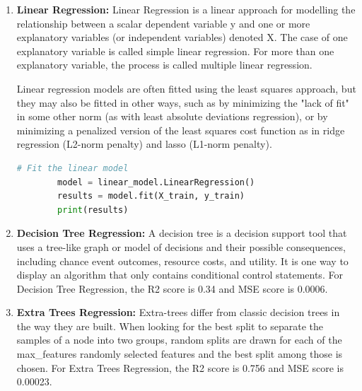 \begin{enumerate}
\begin{lstlisting}[language=Python]
			for i in range(epochs_ratio):
			history = model.fit(features_train, targets_train, epochs=epochs_step, batch_size=100, verbose=0)
			
			# Evaluate the model on the training and validation sets
			print("Step: ", i * epochs_step, "/", epochs_tot)
			train_mse = model.evaluate(features_train, targets_train, verbose=0)[1]
			print("Training MSE:", train_mse)
			val_mse = model.evaluate(features_validation, targets_validation, verbose=0)[1]
			print("Validation MSE:", val_mse, "\n")
			
			# Append the MSE values to the history array
			hist = np.concatenate((hist, np.array(history.history['mean_squared_error'])), axis=0)
		\end{lstlisting}
	
	
	\item \textbf{Linear Regression:}
	 Linear Regression is a linear approach for modelling the relationship between a scalar dependent variable y and one or more explanatory variables (or independent variables) denoted X. The case of one explanatory variable is called simple linear regression. For more than one explanatory variable, the process is called multiple linear regression.
	 
	 Linear regression models are often fitted using the least squares approach, but they may also be fitted in other ways, such as by minimizing the "lack of fit" in some other norm (as with least absolute deviations regression), or by minimizing a penalized version of the least squares cost function as in ridge regression (L2-norm penalty) and lasso (L1-norm penalty).
	 
	 \begin{lstlisting}[language=Python]
	 	# Fit the linear model
	 	model = linear_model.LinearRegression()
	 	results = model.fit(X_train, y_train)
	 	print(results)
	 \end{lstlisting}
 
 	\item \textbf{Decision Tree Regression:}
 	A decision tree is a decision support tool that uses a tree-like graph or model of decisions and their possible consequences, including chance event outcomes, resource costs, and utility. It is one way to display an algorithm that only contains conditional control statements. For Decision Tree Regression, the R2 score is 0.34 and MSE score is 0.0006.
 	
 	 \item \textbf{Extra Trees Regression:}
 	Extra-trees differ from classic decision trees in the way they are built. When looking for the best split to separate the samples of a node into two groups, random splits are drawn for each of the max\_features randomly selected features and the best split among those is chosen. For Extra Trees Regression, the R2 score is 0.756 and MSE score is 0.00023.
 	

\end{enumerate}
